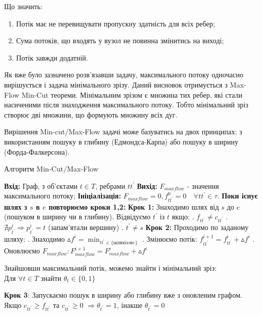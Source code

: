 Що значить:
\begin{enumerate}
    \item Потік має не перевищувати пропускну здатність для всіх ребер;
    \item Сума потоків, що входять у вузол не повинна змінитись на виході;
    \item Потік завжди додатній.
\end{enumerate}

Як вже було зазначено розв'язавши задачу, максимального потоку одночасно вирішується і задача
мінімального зрізу. Даний висновок отримується з Max-Flow Min-Cut теореми.
Мінімальним зрізом є множина тих ребер, які стали насиченими після знаходження максимального
потоку. Тобто мінімальний зріз створює дві множини, що формують множину всіх дуг.

Вирішення Min-cut/Max-Flow задачі може базуватись на двох принципах:
з використанням пошуку в глибину (Едмондса-Карпа) або пошуку в ширину (Форда-Фалкерсона).
\begin{algorithm}[H]
    \caption{Алгоритм Min-Cut/Max-Flow}
    \begin{algorithmic}
        \State \textbf{Вхід:} Граф, з об'єктами $ t \in T $, ребрами $tt^{'} $
        \State \textbf{Вихід:} $ F_{maxflow} $ - значення максимального потоку;
        \State \textbf{Ініціалізація:} $ F_{maxflow} = 0, f_{tt^{'}}^{0} = 0 \quad \forall tt^{'}  \in \tau $.
        \State \textbf{Поки існує шлях з $s$ в $e$ повторюємо кроки 1,2:}
        \State \textbf{Крок 1:} Знаходимо шлях від $s$ до $e$ (пошуком в ширину чи в глибину).
        \State Відвідуємо $ t^{'}$ із $t $ якщо:
        \State {}. $ f_{tt^{'}} \neq c_{tt^{'}} $
        \State {}. $ \nexists p_{t^{'}}^{i} \Rightarrow p_{t^{'}}^{i} = t $ (запам'ятали вершину)
        \State {}. $ t^{'} \neq s $
        \State \textbf{Крок 2:} Проходимо по заданому шляху:
        \State {}. Знаходимо $ \vartriangle f^{i} = \min_{tt^{'} \in \{шлях із s в e \}} $
        \State {}. Змінюємо потік: $ f_{tt^{'}}^{i+1} = f_{tt^{'}}^{i} + \vartriangle f^{i} $
        \State {}. Оновлюємо $ F_{maxflow}: F_{maxflow}^{i+1} = F_{maxflow}^{i} + \vartriangle f^{i} $
    \end{algorithmic}

    Знайшовши максимальний потік, можемо знайти і мінімальний зріз: \\
    Для $\forall t \in T$ знайти $\theta_{t} \in \{0,1\}$
    \begin{algorithmic}
        \State \textbf{Крок 3}: Запускаємо пошук в ширину або глибину вже з оновленим графом.
        \State \qquad Якщо $c_{tt^{'}} \geqslant f_{tt^{'}}$ та $c_{tt^{'}} \geqslant 0$
        $\Rightarrow \theta_{t^{'}} = 1 $, інакше $\theta_{t^{'}} = 0 $
    \end{algorithmic}
\end{algorithm}

